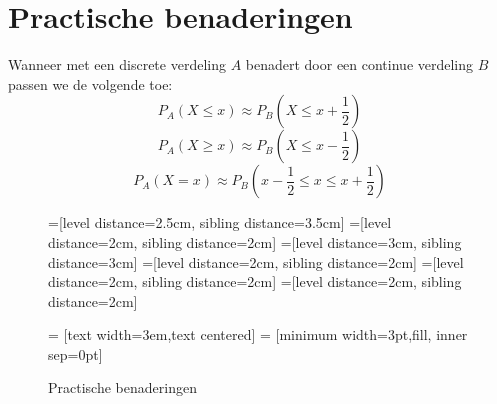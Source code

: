 \documentclass[main.tex]{subfiles}
\begin{document}
\section{Practische benaderingen}
\label{sec:pract-benad}

\begin{de}
  Wanneer met een discrete verdeling $A$ benadert door een continue verdeling $B$ passen we de volgende  toe:
  \[ P_{A}(X\le x) \approx P_{B}\left(X \le x+\frac{1}{2}\right)\]
  \[ P_{A}(X\ge x) \approx P_{B}\left(X \le x-\frac{1}{2}\right)\]
  \[ P_{A}(X=x) \approx P_{B}\left(x-\frac{1}{2} \le x \le x+\frac{1}{2}\right) \]
\end{de}

\begin{figure}[H]
  \label{fig:benaderingen}
  =[level distance=2.5cm, sibling distance=3.5cm]
  =[level distance=2cm, sibling distance=2cm]
  =[level distance=3cm, sibling distance=3cm]
  =[level distance=2cm, sibling distance=2cm]
  =[level distance=2cm, sibling distance=2cm]
  =[level distance=2cm, sibling distance=2cm]

   = [text width=3em,text centered]
   = [minimum width=3pt,fill, inner sep=0pt]

\caption{Practische benaderingen}
\end{figure}
\end{document}
